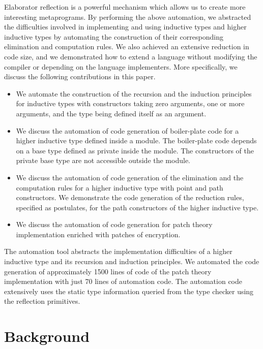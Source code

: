 \documentclass[sigplan,10pt]{acmart}
\begin{document}
Elaborator reflection is a powerful mechanism which allows us to create more interesting metaprograms. By performing the above automation, we abstracted the difficulties involved in implementing and using inductive types and higher inductive types by automating the construction of their corresponding elimination and computation rules. We also achieved an extensive reduction in code size, and we demonstrated how to extend a language without modifying the compiler or depending on the language implementers. More specifically, we discuss the following contributions in this paper.

\begin{itemize}
\item We automate the construction of the recursion and the induction principles for inductive types with constructors taking zero arguments, one or more arguments, and the type being defined itself as an argument.

\item We discuss the automation of code generation of boiler-plate code for a higher inductive type defined inside a module. The boiler-plate code depends on a base type defined as private inside the module. The constructors of the private base type are not accessible outside the module.

\item We discuss the automation of code generation of the elimination and the computation rules for a higher inductive type with point and path constructors. We demonstrate the code generation of the reduction rules, specified as postulates, for the path constructors of the higher inductive type.

\item We discuss the automation of code generation for patch theory \cite{Angiuli-2014} implementation enriched with patches of encryption. 
\end{itemize}

The automation tool abstracts the implementation difficulties of a higher inductive type and its recursion and induction principles. We automated the code generation of approximately 1500 lines of code of the patch theory implementation with just 70 lines of automation code. The automation code extensively uses the static type information queried from the type checker using the reflection primitives.

\section{Background}
\label{sec:sec2}
\end{document}
